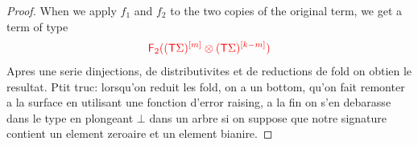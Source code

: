 \begin{proof}
When we apply $f_1$ and $f_2$ to the two copies of the original term, we get a term of type 
\begin{align*}
\ranked{ \reduce 2 (\mati m {(\tmonad \Sigma)}\otimes  \mati {k-m} {(\tmonad\Sigma)})}
\end{align*}
Apres une serie dinjections, de distributivites et de reductions de fold on obtien le resultat. Ptit truc: lorsqu'on reduit les fold, on a un bottom, qu'on fait remonter a la surface en utilisant une fonction d'error raising, a la fin on s'en debarasse dans le type en plongeant $\bot$ dans un arbre si on suppose que notre signature contient un element zeroaire et un element bianire. 
\medskip


\end{proof}
